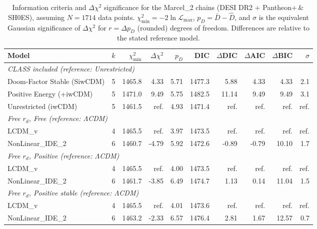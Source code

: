 \begin{table}[htbp]
\centering
\small
\begin{tabular}{lcrrrrrrrr}
\toprule
Model & $k$ & $\chi^2_{\min}$ & $\Delta\chi^2$ & $p_D$ & DIC & $\Delta$DIC & $\Delta$AIC & $\Delta$BIC & $\sigma$ \\
\midrule
\multicolumn{10}{l}{\textit{CLASS included (reference: Unrestricted)}} \\
Doom-Factor Stable (SiwCDM) & 5 & 1465.8 & 4.33 & 5.71 & 1477.3 & 5.88 & 4.33 & 4.33 & 2.1 \\
Positive Energy (+iwCDM) & 5 & 1471.0 & 9.49 & 5.75 & 1482.5 & 11.14 & 9.49 & 9.49 & 3.1 \\
Unrestricted (iwCDM) & 5 & 1461.5 & ref. & 4.93 & 1471.4 & ref. & ref. & ref. & ref. \\
\midrule
\multicolumn{10}{l}{\textit{Free $r_d$, Free (reference: $\Lambda$CDM)}} \\
LCDM\_v & 4 & 1465.5 & ref. & 3.97 & 1473.5 & ref. & ref. & ref. & ref. \\
NonLinear\_IDE\_2 & 6 & 1460.7 & -4.79 & 5.92 & 1472.6 & -0.89 & -0.79 & 10.10 & 1.7 \\
\midrule
\multicolumn{10}{l}{\textit{Free $r_d$, Positive (reference: $\Lambda$CDM)}} \\
LCDM\_v & 4 & 1465.5 & ref. & 4.00 & 1473.5 & ref. & ref. & ref. & ref. \\
NonLinear\_IDE\_2 & 6 & 1461.7 & -3.85 & 6.49 & 1474.7 & 1.13 & 0.14 & 11.04 & 1.5 \\
\midrule
\multicolumn{10}{l}{\textit{Free $r_d$, Positive stable (reference: $\Lambda$CDM)}} \\
LCDM\_v & 4 & 1465.5 & ref. & 4.01 & 1473.6 & ref. & ref. & ref. & ref. \\
NonLinear\_IDE\_2 & 6 & 1463.2 & -2.33 & 6.57 & 1476.4 & 2.81 & 1.67 & 12.57 & 0.7 \\
\bottomrule
\end{tabular}
\caption{Information criteria and $\Delta\chi^2$ significance for the Marcel\_2 chains (DESI DR2 + Pantheon+\,\&\,SH0ES), assuming $N=1714$ data points. $\chi^2_{\min}=-2\ln\mathcal{L}_{\max}$, $p_D=\bar D-\hat D$, and $\sigma$ is the equivalent Gaussian significance of $\Delta\chi^2$ for $r=\Delta p_D$ (rounded) degrees of freedom. Differences are relative to the stated reference model.}
\label{tab:marcel2_ic}
\end{table}
